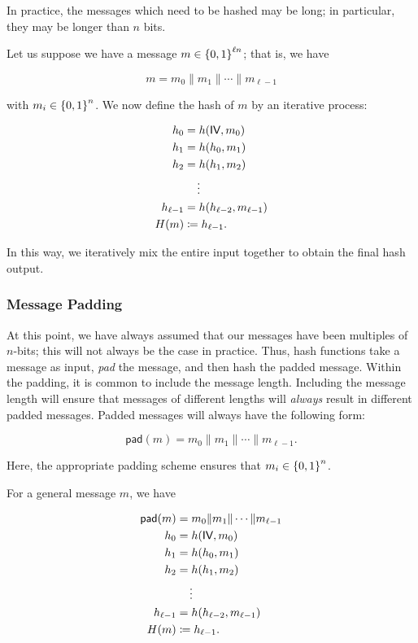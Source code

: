 In practice, the messages which need to be hashed may be long;
in particular, they may be longer than $n$ bits.

Let us suppose we have a message $m\in\left\{ 0,1 \right\}^{\ell n}$;
that is, we have

\begin{equation}
    m = m_{0}\|m_{1}\|\cdots\|m_{\ell-1}
\end{equation}

\noindent
with $m_{i}\in\left\{ 0,1 \right\}^{n}$.
We now define the hash of $m$ by an iterative process:

\begin{align}
    h_{0} &= h(\textsf{IV}, m_{0}) \nonumber\\
    h_{1} &= h(h_{0}, m_{1}) \nonumber\\
    h_{2} &= h(h_{1}, m_{2}) \nonumber\\
        &\quad \vdots \nonumber\\
    h_{\ell-1} &= h(h_{\ell-2}, m_{\ell-1}) \nonumber\\
    H(m) &\coloneqq{} h_{\ell-1}.
\end{align}

\noindent
In this way, we iteratively mix the entire input together
to obtain the final hash output.

\subsubsection{Message Padding}

At this point, we have always assumed that our messages
have been multiples of $n$-bits;
this will not always be the case in practice.
Thus, \glspl{hash function} take a message as input,
\emph{pad} the message,
and then hash the padded message.
Within the padding, it is common to include the message length.
Including the message length will ensure that messages
of different lengths will \emph{always} result in different padded messages.
Padded messages will always have the following form:

\begin{equation}
    \textsf{pad}(m) = m_{0}\|m_{1}\|\cdots\|m_{\ell-1}.
\end{equation}

\noindent
Here, the appropriate padding scheme ensures that
$m_{i}\in\left\{ 0,1 \right\}^{n}$.

For a general message $m$, we have

\begin{align}
    \textsf{pad}(m) &= m_{0}\|m_{1}\|\cdots\|m_{\ell-1} \nonumber\\
    h_{0} &= h(\textsf{IV}, m_{0}) \nonumber\\
    h_{1} &= h(h_{0}, m_{1}) \nonumber\\
    h_{2} &= h(h_{1}, m_{2}) \nonumber\\
        &\quad \vdots \nonumber\\
    h_{\ell-1} &= h(h_{\ell-2}, m_{\ell-1}) \nonumber\\
    H(m) &\coloneqq{} h_{\ell-1}.
\end{align}

